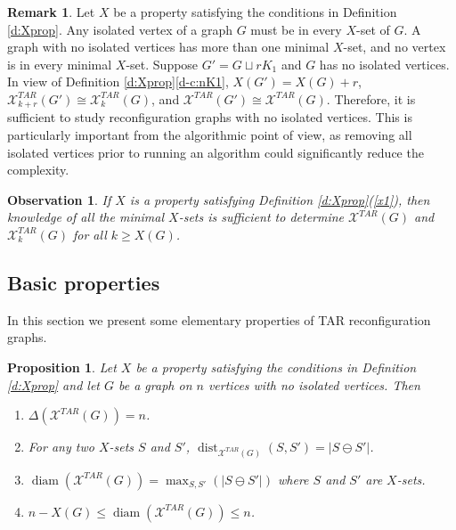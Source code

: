 \documentclass{article}
\numberwithin{figure}{section}   %
\newtheorem{prop}[thm]{Proposition}
\newtheorem{obs}[thm]{Observation}
\theoremstyle{definition}
\newtheorem{rem}[thm]{Remark}
\theoremstyle{definition}
\theoremstyle{definition}
\newcommand{\ben}{\begin{enumerate}}
\newcommand{\een}{\end{enumerate}}
\newcommand{\dist}{\operatorname{dist}}
\newcommand{\diam}{\operatorname{diam}}
\newcommand{\xtar}{\mathscr{X}^{TAR}}
\newcommand{\lh}[1]{{\textcolor{red}{[}\textcolor{red}{{LH: \em #1}]}}}
\newcommand{\df}[1]{{\textcolor{red}{[}\textcolor{red}{{DF: \em #1}]}}}
\begin{document}
\begin{rem}\label{no-isol-vtx} Let $X$ be a property satisfying the conditions in Definition \ref{d:Xprop}. Any isolated vertex of a graph $G$ must be in every $X$-set of $G$.  A graph with no isolated vertices has more than one minimal $X$-set, and no vertex is in every minimal $X$-set.
Suppose $G'=G\sqcup rK_1$ and $G$ has no isolated vertices.   In view of     Definition \ref{d:Xprop}\eqref{d-c:nK1},   $X(G')=X(G)+r$, $\xtar_{k+r}(G')\cong\xtar_k(G)$, and $\xtar(G')\cong\xtar(G)$. 
Therefore, it is sufficient to study reconfiguration   graphs with no isolated vertices. This is particularly important from the algorithmic point of view, as removing all isolated vertices prior to running an algorithm could significantly reduce the complexity. %
\end{rem}

\begin{obs}\label{new-obs} If $X$ is a property satisfying   Definition \ref{d:Xprop}(\ref{x1}), then  knowledge of all the minimal $X$-sets is sufficient to determine $\xtar (G)$ and $\xtar_k (G)$ for all $k\ge X(G)$.  \end{obs}

\subsection{Basic properties}\label{ss:ubasic}

In this section we present some elementary properties of TAR reconfiguration graphs. %


\begin{prop}\label{x-deg-diam} Let $X$ be a property satisfying the conditions in Definition \ref{d:Xprop} and
let  $G$ be a graph on $n$ vertices with no isolated vertices. Then 
\ben\item\label{p-c:umaxdeg} 
$\Delta(\xtar (G))=n$.
\item\label{p-c:udist} For any two $X$-sets $S$ and $S'$,  $\dist_{\xtar(G)}(S,S')= |S\ominus S'|$.
\item\label{p-c:udiam} $\diam(\xtar (G))=\max_{S,S'}(|S\ominus S'|)$ where $S$ and $S'$ are  $X$-sets.
\item\label{p-c:udiam-bd} $n-X(G)\le \diam(\xtar (G))\le n$.
\een
\end{prop}
\end{document}
